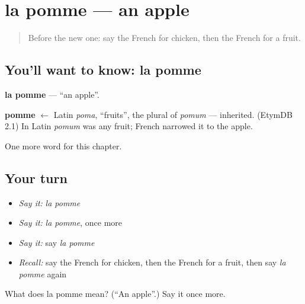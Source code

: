 \section[la pomme]{la pomme — an apple}

\label{lesson:FR-C67-pomme}



\begin{quote}
Before the new one: say the French for chicken, then the French for a fruit.
\end{quote}

\subsection*{You'll want to know: la pomme}
\textbf{la pomme} — \textquotedblleft{}an apple\textquotedblright{}.

\begin{cousinweb}
\textbf{pomme} $\leftarrow$ Latin \emph{poma}, \textquotedblleft{}fruits\textquotedblright{}, the plural of \emph{pomum} — inherited. (EtymDB 2.1) In Latin \emph{pomum} was any fruit; French narrowed it to the apple.
\end{cousinweb}

\begin{grammarlens}[title={What you've built}]
One more word for this chapter.
\end{grammarlens}

\subsection*{Your turn}
\begin{itemize}
\raggedright
  \item \emph{Say it:} \emph{la pomme}
  \item \emph{Say it:} \emph{la pomme}, once more
  \item \emph{Say it:} say \emph{la pomme}
  \item \emph{Recall:} say the French for chicken, then the French for a fruit, then say \emph{la pomme} again
\end{itemize}

\begin{tcolorbox}[breakable,colback=teal!4,colframe=teal!35!black,title={Before you move on}]
What does la pomme mean? (\textquotedblleft{}An apple\textquotedblright{}.) Say it once more.
\end{tcolorbox}

